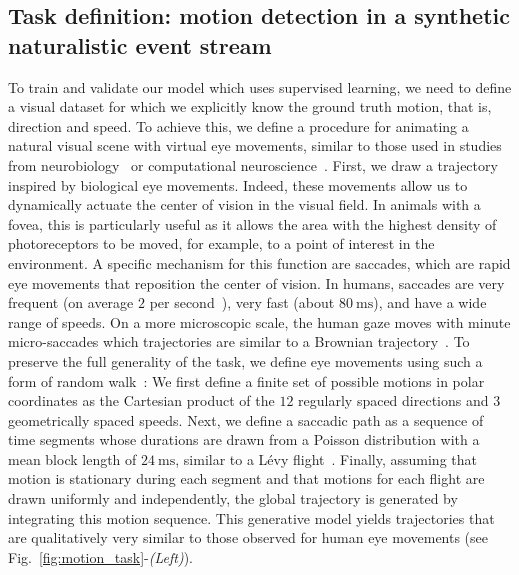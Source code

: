 \documentclass[default]{sn-jnl}%
\theoremstyle{thmstyleone}%
\theoremstyle{thmstyletwo}%
\theoremstyle{thmstylethree}%
\newcommand{\seeFig}[1]{see Fig.~\ref{fig:#1}}%
\newcommand{\ms}{\si{\milli\second}}%
\begin{document}
\subsection{Task definition: motion detection in a synthetic naturalistic event stream}\label{sec:task}
To train and validate our model which uses supervised learning, we need to define a visual dataset for which we explicitly know the ground truth motion, that is, direction and speed. To achieve this, we define a procedure for animating a natural visual scene with virtual eye movements, similar to those used in  studies from neurobiology~\citep{vinje_sparse_2000, baudot_animation_2013} or computational neuroscience~\citep{kremkow_push-pull_2016}. First, we draw a trajectory inspired by biological eye movements. Indeed, these movements allow us to dynamically actuate the center of vision in the visual field. In animals with a fovea, this is particularly useful as it allows the area with the highest density of photoreceptors to be moved, for example, to a point of interest in the environment. A specific mechanism for this function are saccades, which are rapid eye movements that reposition the center of vision. In humans, saccades are very frequent (on average $2$ per second~\citep{dandekar_neural_2012}), very fast (about $80~\ms$), and have a wide range of speeds. On a more microscopic scale, the human gaze moves with minute micro-saccades which trajectories are similar to a Brownian trajectory~\citep{poletti_head-eye_2015}. To preserve the full generality of the task, we define eye movements using such a form of random walk~\citep{engbert_integrated_2011}: We first define a finite set of possible motions in polar coordinates as the Cartesian product of the $12$ regularly spaced directions and $3$ geometrically spaced speeds. Next, we define a saccadic path as a sequence of time segments whose durations are drawn from a Poisson distribution with a mean block length of $24~\ms$, similar to a Lévy flight~\citep[p. 289]{mandelbrot_fractal_1982}. Finally, assuming that  motion is stationary during each segment and that motions for each flight are drawn uniformly and independently, the global trajectory is generated by integrating this motion sequence. This generative model yields trajectories that are qualitatively very similar to those observed for human eye movements (\seeFig{motion_task}-\textit{(Left)}).
\end{document}
